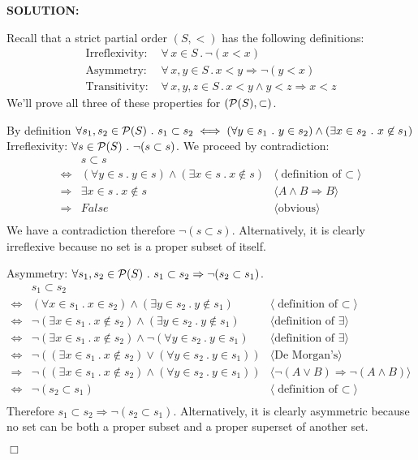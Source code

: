 \documentclass[11pt,fleqn]{article}
\newcommand{\sglsp}{\ }
\newenvironment{proof}{\par\noindent{\bf Proof\sglsp}}{\hfill$\Box$}
\newcommand{\pnote}[1]{{\langle \text{#1} \rangle}}
\newcommand{\sP}{\mbox{$\cal P$}}
\newcommand{\mdot}{\mathrel.}
\begin{document}
	\textbf{SOLUTION:}
	\begin{proof}
	Recall that a strict partial order $(S, <)$ has the following definitions:
	\begin{align*}
		\mbox{Irreflexivity: } & \forall\,x \in S \mdot \lnot(x < x)\\
		\mbox{Asymmetry: } & \forall\, x, y \in S \mdot x < y \Rightarrow \lnot(y < x)\\
		\mbox{Transitivity: } & \forall\, x, y, z \in S \mdot x < y \land y < z \Rightarrow x < z
	\end{align*}
	We'll prove all three of these properties for $(\sP(S), \subset)$.
	
	By definition $\forall s_1,s_2 \in \sP(S) ~.~ s_1 \subset s_2 \iff (\forall y \in s_1 ~.~ y \in s_2) \wedge (\exists x \in s_2 ~.~ x \not\in s_1)$ \\
	
	Irreflexivity: $\forall s \in \sP(S) ~.~ \neg{(s \subset s)}$. 
	We proceed by contradiction:
	\begin{align*}
		& s \subset s & \\
		\iff & (\forall y \in s ~.~ y \in s) \wedge (\exists x \in s ~.~ x \not\in s) & \pnote{definition of $\subset$} \\
		\Rightarrow & \exists x \in s ~.~ x \not\in s & \pnote{$A \wedge B \Rightarrow B$} \\
		\Rightarrow & False & \pnote{obvious} \\
	\end{align*}
	We have a contradiction therefore $\neg{(s \subset s)}$.
	Alternatively, it is clearly irreflexive because no set is a proper subset of itself. 
		
	Asymmetry: $\forall s_1,s_2 \in \sP(S) ~.~ s_1 \subset s_2 \Rightarrow \neg{(s_2 \subset s_1)}$.
	\begin{align*}
		& s_1 \subset s_2 & \\
		\iff & (\forall x \in s_1 ~.~ x \in s_2) \wedge (\exists y \in s_2 ~.~ y \not\in s_1) & \pnote{definition of $\subset$} \\
		\iff & \neg{(\exists x \in s_1 ~.~ x \not\in s_2)} \wedge (\exists y \in s_2 ~.~ y \not\in s_1) & \pnote{definition of $\exists$} \\
		\iff & \neg{(\exists x \in s_1 ~.~ x \not\in s_2)} \wedge \neg{(\forall y \in s_2 ~.~ y \in s_1)} & \pnote{definition of $\exists$} \\
		\iff & \neg{((\exists x \in s_1 ~.~ x \not\in s_2) \vee (\forall y \in s_2 ~.~ y \in s_1))} & \pnote{De Morgan's} \\
		\Rightarrow & \neg{((\exists x \in s_1 ~.~ x \not\in s_2) \wedge (\forall y \in s_2 ~.~ y \in s_1))} & \pnote{$\neg{(A \vee B)} \Rightarrow \neg{(A \wedge B)}$} \\
		\iff & \neg{(s_2 \subset s_1)} & \pnote{definition of $\subset$} \\
	\end{align*}
	Therefore $s_1 \subset s_2 \Rightarrow \neg{(s_2 \subset s_1)}$.
	Alternatively, it is clearly asymmetric because no set can be both a proper subset and a proper superset of another set.
	

\end{proof}
\end{document}
